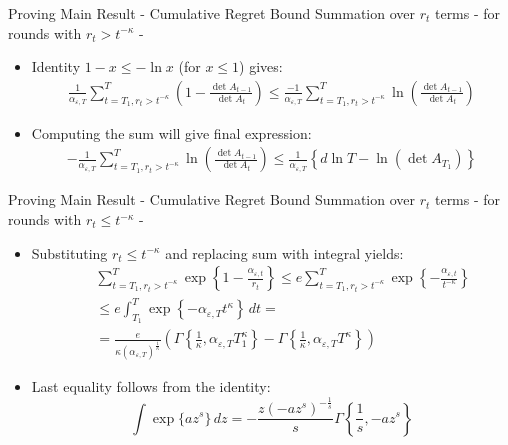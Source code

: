 \documentclass{beamer}
\begin{document}
\begin{frame}{Proving Main Result - Cumulative Regret Bound}
Summation over $r_t$ terms - for rounds with $r_t> t^{-\kappa}$ - \newline
\begin{itemize}
\item Identity $1-x\leq -\ln{x}$ (for $x\leq1$) gives:
\begin{eqnarray*}
\frac{1}{\alpha_{\varepsilon,T}}\sum\limits_{t=T_1,r_t> t^{-\kappa}}^{T}\left(1-\frac{\det{A_{t-1}}}{\det{A_t}}\right)\leq \frac{-1}{\alpha_{\varepsilon,T}}\sum\limits_{t=T_1,r_t> t^{-\kappa}}^{T}\ln{\left(\frac{\det{A_{t-1}}}{\det{A_t}}\right)}
\end{eqnarray*}
\item Computing the sum will give final expression:
\begin{eqnarray*}
 -\frac{1}{\alpha_{\varepsilon,T}}\sum\limits_{t=T_1,r_t> t^{-\kappa}}^{T}\ln{\left(\frac{\det{A_{t-1}}}{\det{A_t}}\right)}\leq \frac{1}{\alpha_{\varepsilon,T}}\left\{d\ln{T}- \ln\left(\det{A_{T_1}}\right)\right\}
\end{eqnarray*}
\end{itemize}
\end{frame}

\begin{frame}{Proving Main Result - Cumulative Regret Bound}
Summation over $r_t$ terms - for rounds with $r_t\leq t^{-\kappa}$ - \newline
\begin{itemize}
\item Substituting  $r_t\leq t^{-\kappa}$ and replacing sum with integral yields:  
\begin{eqnarray*}
&&\sum\limits_{t=T_1,r_t> t^{-\kappa}}^{T}\exp\left\{1-\frac{\alpha_{\varepsilon,t}}{r_t}\right\}\leq e\sum\limits_{t=T_1,r_t> t^{-\kappa}}^{T}\exp\left\{-\frac{\alpha_{\varepsilon,t}}{t^{-\kappa}}\right\}\nonumber\\
&&\leq e\int_{T_1}^{T}\nonumber\exp\left\{-\alpha_{\varepsilon,T}t^{\kappa}\right\}\,dt=\nonumber\\
&&=\frac{e}{\kappa\left(\alpha_{\varepsilon,T}\right)^{\frac{1}{\kappa}}}\left(\Gamma\left\{\frac{1}{\kappa},\alpha_{\varepsilon,T}T_{1}^{\kappa}\right\}-\Gamma\left\{\frac{1}{\kappa},\alpha_{\varepsilon,T}T^{\kappa}\right\}\right)\nonumber
\end{eqnarray*}
\item Last equality follows from the identity:
\begin{equation*}
\int\exp\{az^s\}\,dz=-\frac{z(-az^s)^{-\frac{1}{s}}}{s}\Gamma\left\{\frac{1}{s},-az^s\right\}
\label{incomplete_gamma}
\end{equation*}
\end{itemize}
\end{frame}
\end{document}
